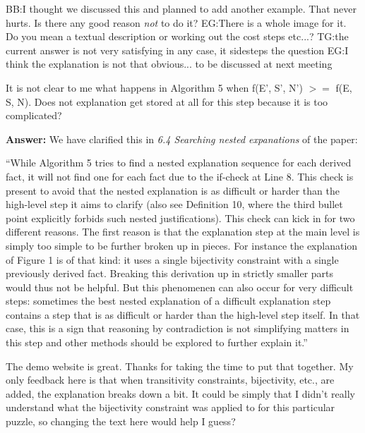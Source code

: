 \documentclass{article}
\newcommand\comment[1]{\marginpar{\tiny #1}}
\renewcommand\comment[1]{#1}
\newcommand{\tias}[1]{{\comment{\color{blue}\textsc{TG:}#1}}}
\newcommand{\emilio}[1]{{\comment{\color{red} \textsc{EG:}#1}}}
\newcommand{\answer}[1]{{\comment{\textbf{Answer:} #1}}}
\newcommand{\bart}[1]{{\comment{\color{green} \textsc{BB:}#1}}}
\begin{document}
\bart{I thought we discussed this and planned to add another example. That never hurts. Is there any good reason \emph{not} to do it?}
\emilio{There is a whole image for it. Do you mean a textual description or working out the cost steps etc...?}
\tias{the current answer is not very satisfying in any case, it sidesteps the question}
\emilio{I think the explanation is not that obvious... to be discussed at next meeting}

\begin{quoteit}
It is not clear to me what happens in Algorithm 5 when f(E', S', N') $>=$ f(E, S, N). Does not explanation get stored at all for this step because it is too complicated? 
\end{quoteit}

\answer{We have clarified this in \emph{6.4 Searching nested expanations} of the paper:
	
		``While Algorithm 5 tries to find a nested explanation sequence for each derived fact, it will not find one for each fact due to the if-check at Line 8. 
		This check is present to avoid that the nested explanation is as difficult or harder than the high-level step it aims to clarify (also see Definition 10, where the third bullet point explicitly forbids such nested justifications).  
		This check can kick in for two different reasons. The first reason is that the explanation step at the main level is simply too simple to be further broken up in pieces. For instance the explanation of Figure 1 is of that kind: it uses a single bijectivity constraint with a single previously derived fact. Breaking this derivation up in strictly smaller parts would thus not be helpful. But this phenomenen can also occur for very difficult steps: sometimes the best nested explanation of a difficult explanation step contains a step that is as difficult or harder than the high-level step itself. In that case, this is a sign that reasoning by contradiction is not simplifying matters in this step and other methods should be explored to further explain it.''}

\begin{quoteit}
The demo website is great. Thanks for taking the time to put that together. My only feedback here is that when transitivity constraints, bijectivity, etc., are added, the explanation breaks down a bit. It could be simply that I didn't really  understand what the bijectivity constraint was applied to for this particular puzzle, so changing the text here would help I guess?
\end{quoteit}
\end{document}
